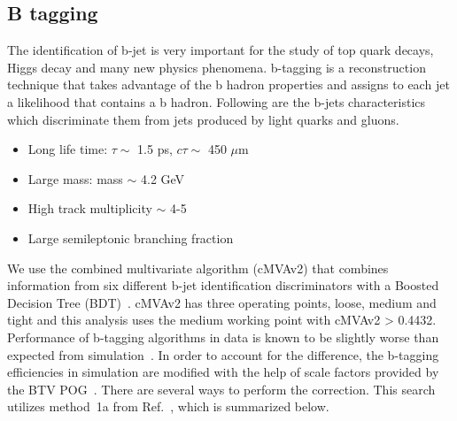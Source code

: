 \subsection{B tagging}
\label{Sec:BTagReweighting}
%
The identification of b-jet is very important for the study of top quark decays, Higgs decay and many new physics phenomena. b-tagging is a reconstruction technique that takes advantage of the b hadron properties and assigns to each jet a likelihood that contains a b hadron. Following are the b-jets characteristics which discriminate them from jets produced by light quarks and gluons.
\begin{itemize}
\item Long life time: $\tau \sim$ 1.5 ps, $c\tau \sim$ 450 $\mu $m
\item Large mass: mass $\sim$ 4.2 GeV 
\item High track multiplicity $\sim$ 4-5
\item Large semileptonic branching fraction 
\end{itemize}
We use the combined multivariate algorithm (cMVAv2) that combines information from six different b-jet identification discriminators with a Boosted Decision Tree (BDT)~\cite{cms_pas_cmvav2}. cMVAv2 has three operating points, loose, medium and tight and this analysis uses the medium working point with cMVAv2 > 0.4432. 
Performance of b-tagging algorithms in data is known to be slightly worse than expected from simulation~\cite{CMS-PAS-BTV-15-001}.
In order to account for the difference, the b-tagging efficiencies in simulation are modified with the help of scale factors provided by the BTV POG~\cite{Wiki:BTagSF}.
There are several ways to perform the correction.
This search utilizes method~1a from Ref.~\cite{Wiki:BTagSFMethods}, which is summarized below.


